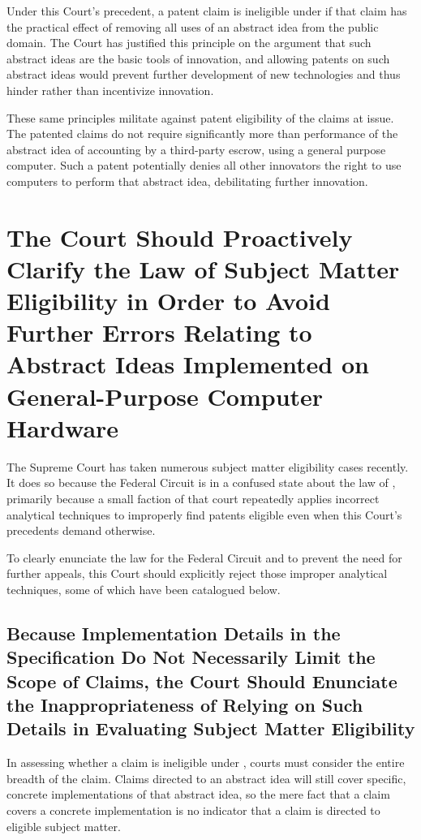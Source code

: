 \documentclass{scotus}
\begin{document}
Under this Court's precedent, a patent claim is ineligible under  if
that claim has the practical effect of removing all uses of an abstract idea
from the public domain. The Court has justified this principle on the argument
that such abstract ideas are the basic tools of innovation, and allowing patents
on such abstract ideas would prevent further development of new technologies and
thus hinder rather than incentivize innovation.

These same principles militate against patent eligibility of the claims at
issue. The patented claims do not require significantly more than performance of
the abstract idea of accounting by a third-party escrow, using a general purpose
computer. Such a patent potentially denies all other innovators the right to use
computers to perform that abstract idea, debilitating further innovation.

\section{The Court Should Proactively Clarify the Law of Subject Matter
Eligibility in Order to Avoid Further Errors Relating to Abstract Ideas
Implemented on General-Purpose Computer Hardware}

The Supreme Court has taken numerous subject matter eligibility cases recently.
It does so because the Federal Circuit is in a confused state about the law of
, primarily because a small faction of that court repeatedly applies
incorrect analytical techniques to improperly find patents eligible even when
this Court's precedents demand otherwise.

To clearly enunciate the law for the Federal Circuit and to prevent the need for
further appeals, this Court should explicitly reject those improper analytical
techniques, some of which have been catalogued below.

\subsection{Because Implementation Details in the Specification Do Not
Necessarily Limit the Scope of Claims, the Court Should Enunciate the
Inappropriateness of Relying on Such Details in Evaluating Subject Matter
Eligibility}

In assessing whether a claim is ineligible under , courts must
consider the entire breadth of the claim. Claims directed to an abstract idea
will still cover specific, concrete implementations of that abstract idea, so
the mere fact that a claim covers a concrete implementation is no indicator that
a claim is directed to eligible subject matter.
\end{document}
